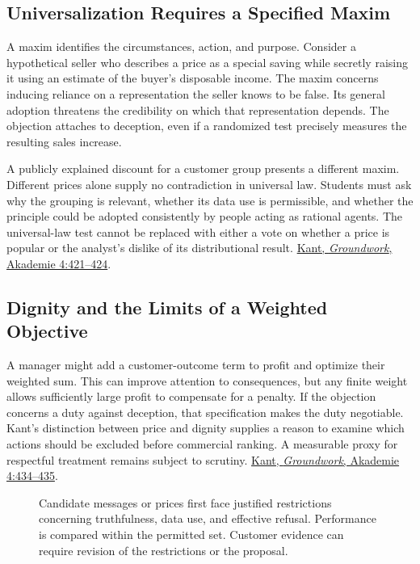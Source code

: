 \hypertarget{M09-universalization-requires-a-specified-maxim}{%
\subsection{Universalization Requires a Specified
Maxim}\label{M09-universalization-requires-a-specified-maxim}}

\noindent A maxim identifies the circumstances, action, and purpose. Consider a
hypothetical seller who describes a price as a special saving while
secretly raising it using an estimate of the buyer's disposable income.
The maxim concerns inducing reliance on a representation the seller
knows to be false. Its general adoption threatens the credibility on
which that representation depends. The objection attaches to deception,
even if a randomized test precisely measures the resulting sales
increase.

A publicly explained discount for a customer group presents a different
maxim. Different prices alone supply no contradiction in universal law.
Students must ask why the grouping is relevant, whether its data use is
permissible, and whether the principle could be adopted consistently by
people acting as rational agents. The universal-law test cannot be
replaced with either a vote on whether a price is popular or the
analyst's dislike of its distributional result.
\href{https://www.gutenberg.org/ebooks/5682}{Kant, \emph{Groundwork},
Akademie 4:421--424}.

\hypertarget{M09-dignity-and-the-limits-of-a-weighted-objective}{%
\subsection{Dignity and the Limits of a Weighted
Objective}\label{M09-dignity-and-the-limits-of-a-weighted-objective}}

\noindent A manager might add a customer-outcome term to profit and optimize their
weighted sum. This can improve attention to consequences, but any finite
weight allows sufficiently large profit to compensate for a penalty. If
the objection concerns a duty against deception, that specification
makes the duty negotiable. Kant's distinction between price and dignity
supplies a reason to examine which actions should be excluded before
commercial ranking. A measurable proxy for respectful treatment remains
subject to scrutiny. \href{https://www.gutenberg.org/ebooks/5682}{Kant,
\emph{Groundwork}, Akademie 4:434--435}.

\begin{figure}[htbp]
\centering

\caption{Candidate messages or prices first face justified restrictions concerning truthfulness, data use, and effective refusal. Performance is compared within the permitted set. Customer evidence can require revision of the restrictions or the proposal.}\label{fig:M09_optimization_boundary}
\end{figure}

